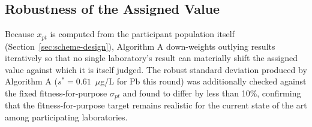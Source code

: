 \subsection{Robustness of the Assigned Value}
Because \(x_{pt}\) is computed from the participant population itself (Section~\ref{sec:scheme-design}),
Algorithm A down-weights outlying results iteratively so that no single laboratory's result can
materially shift the assigned value against which it is itself judged. The robust standard
deviation produced by Algorithm A (\(s^{*} = 0.61\)~\(\mu\)g/L for Pb this round) was additionally
checked against the fixed fitness-for-purpose \(\sigma_{pt}\) and found to differ by less than
10\%, confirming that the fitness-for-purpose target remains realistic for the current state of
the art among participating laboratories.
